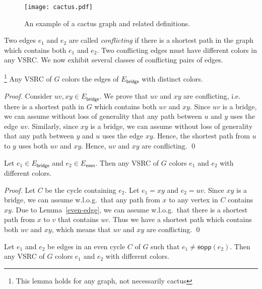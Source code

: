 \documentclass[letter,runningheads,envcountsame,envcountsect]{llncs}
\newcommand{\cvsrc}{VSRC}
\newcommand{\et}{E_{\mathsf{bridge}}}
\newcommand{\eeven}{E_{\mathsf{even}}}
\newcommand{\eeopp}{\mathsf{eopp}}
\begin{document}
\begin{figure}[tbp]
\centering
	\texttt{[image: cactus.pdf]}
	\caption{An example of a cactus graph and related definitions.} 
	\label{fig:cactus}	
\end{figure}

Two edges $e_1$ and $e_2$ are called \emph{conflicting} if there is a shortest path in the graph which contains both $e_1$ and $e_2$. Two conflicting edges must have different colors in any \cvsrc. We now exhibit several classes of conflicting pairs of edges.

\begin{lemma} \label{bridge-bridge}\footnote{This lemma holds for any graph, not necessarily cactus}
Any {\cvsrc} of $G$ colors the edges of $\et$ with distinct colors.
\end{lemma}
\begin{proof}
Consider $uv,xy\in \et$.	
We prove that $uv$ and $xy$ are conflicting, i.e. there is a shortest path in $G$  which contains both $uv$ and $xy$. 
Since $uv$ is a bridge, we can assume without loss of generality that any path between $u$ and $y$ uses the edge $uv$.
Similarly, since $xy$ is a bridge, we can assume without loss of generality that any path between $y$ and $u$ uses the edge $xy$.
Hence, the shortest path from $u$ to $y$ uses both $uv$ and $xy$. 
Hence, $uv$ and $xy$ are conflicting.
\qed\end{proof}

\begin{lemma}
	\label{bridge-even}
	Let $e_1\in \et$ and $e_2\in \eeven$. Then any {\cvsrc} of $G$ colors $e_1$ and $e_2$ with different colors.
\end{lemma}
\begin{proof}
Let $C$ be the cycle containing $e_2$. Let $e_1=xy$ and $e_2=uv$.
	Since $xy$ is a bridge, we can assume w.l.o.g.\ that any path from $x$ to any vertex in $C$ contains $xy$.
	Due to Lemma~\ref{even-edge}, we can assume w.l.o.g.\ that there is a shortest path from $x$ to $v$ that contains $uv$.
	Thus we have a shortest path which contains both $uv$ and $xy$, which means that $uv$ and $xy$ are conflicting.
\qed\end{proof}


\begin{observation} \label{base-even}
Let $e_1$ and $e_2$ be edges in an even cycle $C$ of $G$ such that $e_1 \not= \eeopp(e_2)$. Then any {\cvsrc} of $G$ colors $e_1$ and $e_2$ with different colors.
\end{observation}
\end{document}
